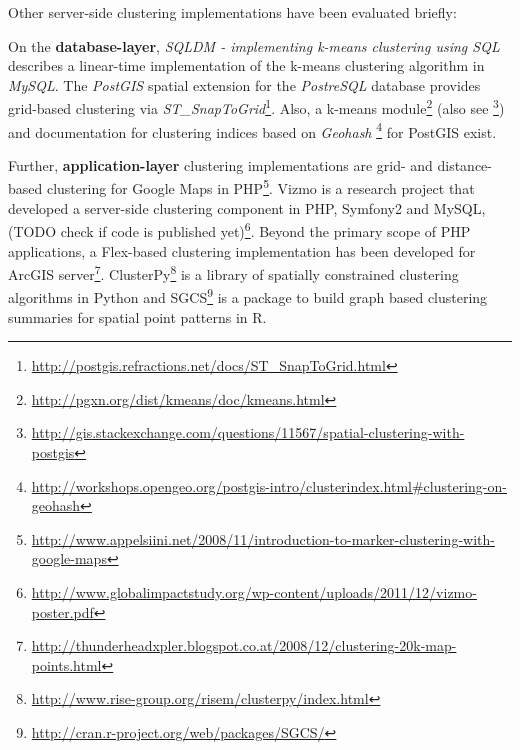 Other server-side clustering implementations have been evaluated briefly:

On the \textbf{database-layer}, \textit{SQLDM - implementing k-means clustering using SQL} describes a linear-time implementation of the k-means clustering algorithm in \textit{MySQL}\cite{Simha07sqldm}.
 The \textit{PostGIS} spatial extension for the \textit{PostreSQL} database provides grid-based clustering via \textit{ST\_SnapToGrid}\footnote{\url{http://postgis.refractions.net/docs/ST_SnapToGrid.html}}. Also, a k-means module\footnote{\url{http://pgxn.org/dist/kmeans/doc/kmeans.html}} (also see \footnote{\url{http://gis.stackexchange.com/questions/11567/spatial-clustering-with-postgis}}) and documentation for clustering indices based on \textit{Geohash} \footnote{\url{http://workshops.opengeo.org/postgis-intro/clusterindex.html\#clustering-on-geohash}} for PostGIS exist.

Further, \textbf{application-layer} clustering implementations are grid- and distance-based clustering for Google Maps in PHP\footnote{\url{http://www.appelsiini.net/2008/11/introduction-to-marker-clustering-with-google-maps}}. Vizmo is a research project that developed a server-side clustering component in PHP, Symfony2 and MySQL, (TODO check if code is published yet)\footnote{\url{http://www.globalimpactstudy.org/wp-content/uploads/2011/12/vizmo-poster.pdf}}. Beyond the primary scope of PHP applications, a Flex-based clustering implementation has been developed for ArcGIS server\footnote{\url{http://thunderheadxpler.blogspot.co.at/2008/12/clustering-20k-map-points.html}}. ClusterPy\footnote{\url{http://www.rise-group.org/risem/clusterpy/index.html}} is a library of spatially constrained clustering algorithms in Python and SGCS\footnote{\url{http://cran.r-project.org/web/packages/SGCS/}} is a package to build graph based clustering summaries for spatial point patterns in R.





















